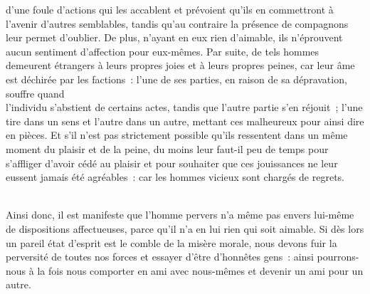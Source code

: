 \documentclass[french,twoside]{book} %
\begin{document}
d’une foule d’actions qui les accablent et prévoient qu’ils en commettront à l’avenir d’autres semblables, tandis qu’au contraire la présence de compagnons leur permet d’oublier. De plus, n’ayant en eux rien d’aimable, ils n’éprouvent aucun sentiment d’affection pour eux-mêmes. Par suite, de tels hommes demeurent étrangers à leurs propres joies et à leurs propres peines, car leur âme est déchirée par les factions : l’une de ses parties, en raison de sa dépravation, souffre quand \\
l’individu s’abstient de certains actes, tandis que l’autre partie s’en réjouit ; l’une tire dans un sens et l’autre dans un autre, mettant ces malheureux pour ainsi dire en pièces. Et s’il n’est pas strictement possible qu’ils ressentent dans un même moment du plaisir et de la peine, du moins leur faut-il peu de temps pour s’affliger d’avoir cédé au plaisir et pour souhaiter que ces jouissances ne leur eussent jamais été agréables : car les hommes vicieux sont chargés de regrets.\par
\\
Ainsi donc, il est manifeste que l’homme pervers n’a même pas envers lui-même de dispositions affectueuses, parce qu’il n’a en lui rien qui soit aimable. Si dès lors un pareil état d’esprit est le comble de la misère morale, nous devons fuir la perversité de toutes nos forces et essayer d’être d’honnêtes gens : ainsi pourrons-nous à la fois nous comporter en ami avec nous-mêmes et devenir un ami pour un autre.
\end{document}
